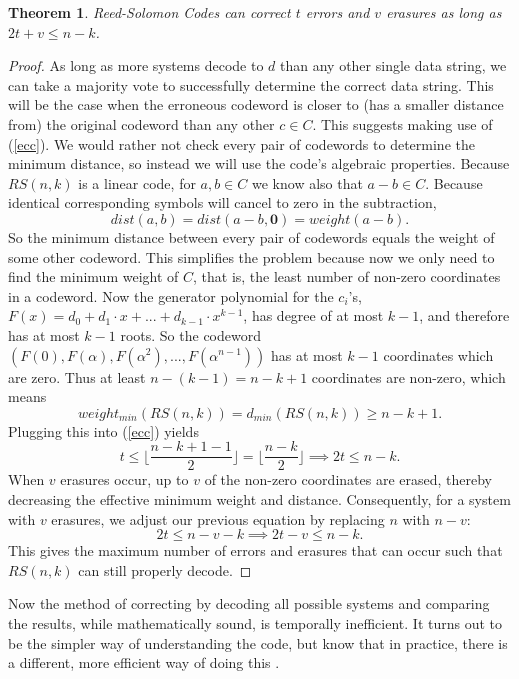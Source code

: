 \documentclass[11pt]{article}
\newtheorem*{theorem}{Theorem}
\begin{document}
\begin{theorem}
Reed-Solomon Codes can correct $t$ errors and $v$ erasures as long as\\$2t+v\le n-k$.
\end{theorem}
\begin{proof}
As long as more systems decode to $d$ than any other single data string, we can take a majority vote to successfully determine the correct data string. This will be the case when the erroneous codeword is closer to (has a smaller distance from) the original codeword than any other $c\in C$. This suggests making use of (\ref{ecc}). We would rather not check every pair of codewords to determine the minimum distance, so instead we will use the code's algebraic properties. Because $RS(n,k)$ is a linear code, for $a,b\in C$ we know also that $a-b\in C$. Because identical corresponding symbols will cancel to zero in the subtraction,
\[dist(a,b)=dist(a-b,\textbf{0})=weight(a-b).\]
So the minimum distance between every pair of codewords equals the weight of some other codeword. This simplifies the problem because now we only need to find the minimum weight of $C$, that is, the least number of non-zero coordinates in a codeword. Now the generator polynomial for the $c_{i}$'s, $F(x)=d_{0}+d_{1}\cdot x+...+d_{k-1}\cdot x^{k-1}$, has degree of at most $k-1$, and therefore has at most $k-1$ roots. So the codeword $(F(0),F(\alpha),F(\alpha^{2}),...,F(\alpha^{n-1}))$ has at most $k-1$ coordinates which are zero. \cite[2]{introductiontocodingtheory} Thus at least $n-(k-1)=n-k+1$ coordinates are non-zero, which means \[weight_{min}(RS(n,k))=d_{min}(RS(n,k))\ge n-k+1.\]
Plugging this into (\ref{ecc}) yields \[t\le\lfloor\dfrac{n-k+1-1}{2}\rfloor=\lfloor\dfrac{n-k}{2}\rfloor\implies 2t\le n-k.\]
When $v$ erasures occur, up to $v$ of the non-zero coordinates are erased, thereby decreasing the effective minimum weight and distance. Consequently, for a system with $v$ erasures, we adjust our previous equation by replacing $n$ with $n-v$:
\[2t\le n-v-k\implies2t-v\le n-k.\]
This gives the maximum number of errors and erasures that can occur such that $RS(n,k)$ can still properly decode.
\end{proof}

Now the method of correcting by decoding all possible systems and comparing the results, while mathematically sound, is temporally inefficient.  It turns out to be the simpler way of understanding the code, but know that in practice, there is a different, more efficient way of doing this \cite[262]{ascodingtheory}.
\end{document}
